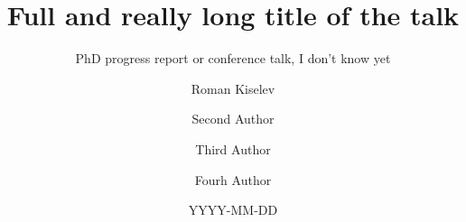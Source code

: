 %
%


\usepackage{graphicx}          %
\usepackage{hyperref}          %
\usepackage{pgf}

\graphicspath{ {./img/} }



\title[Short title of the talk]
      {Full and really long title of the talk}

\subtitle{PhD progress report or conference talk, I don't know yet}

\date[CONFname]{YYYY-MM-DD}



\author[R. Kiselev]{
  Roman Kiselev        \and
  Second Author        \and
  Third Author       \and
  Fourh Author    
  }

